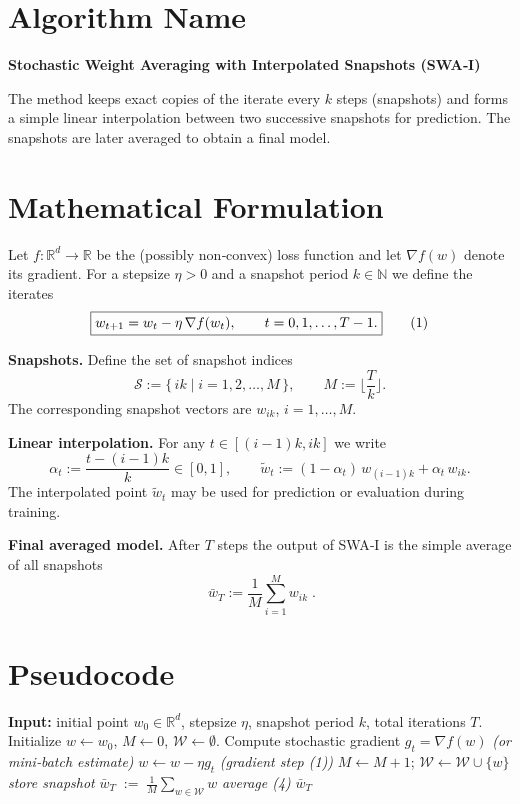 \documentclass{article}
\begin{document}
\section*{Algorithm Name}
\textbf{Stochastic Weight Averaging with Interpolated Snapshots (SWA‑I)}  

The method keeps exact copies of the iterate every $k$ steps (snapshots) and
forms a simple linear interpolation between two successive snapshots for
prediction.  The snapshots are later averaged to obtain a final
model.

\section*{Mathematical Formulation}
Let $f:\mathbb{R}^{d}\rightarrow\mathbb{R}$ be the (possibly non‑convex) loss
function and let $\nabla f(w)$ denote its gradient.  
For a stepsize $\eta>0$ and a snapshot period $k\in\mathbb{N}$ we define
the iterates
\[
\boxed{%
w_{t+1}=w_{t}-\eta\,\nabla f(w_{t}),\qquad t=0,1,\dots,T-1.}
\tag{1}
\]

\noindent
\textbf{Snapshots.}
Define the set of snapshot indices
\[
\mathcal{S}:=\{\,i k\mid i=1,2,\dots,M\,\},\qquad M:=\Big\lfloor\frac{T}{k}\Big\rfloor .
\tag{2}
\]
The corresponding snapshot vectors are $w_{i k}$, $i=1,\dots,M$.

\noindent
\textbf{Linear interpolation.}
For any $t\in[(i-1)k,i k]$ we write
\[
\alpha_{t}:=\frac{t-(i-1)k}{k}\in[0,1],\qquad
\tilde w_{t}:=(1-\alpha_{t})\,w_{(i-1)k}+\alpha_{t}\,w_{i k}.
\tag{3}
\]
The interpolated point $\tilde w_{t}$ may be used for prediction or
evaluation during training.

\noindent
\textbf{Final averaged model.}
After $T$ steps the output of SWA‑I is the simple average of all snapshots
\[
\boxed{\;\bar w_{T}:=\frac{1}{M}\sum_{i=1}^{M} w_{i k}\; }.
\tag{4}
\]

\section*{Pseudocode}
\begin{algorithm}[H]
\caption{SWA‑I}
\begin{algorithmic}[1]
\STATE \textbf{Input:} initial point $w_{0}\in\mathbb{R}^{d}$, stepsize $\eta$, snapshot period $k$, total iterations $T$.
\STATE Initialize $w\leftarrow w_{0}$, $M\leftarrow 0$, $\mathcal{W}\leftarrow\emptyset$.
    \STATE Compute stochastic gradient $g_{t}=\nabla f(w)$   \hfill \textit{(or mini‑batch estimate)}
    \STATE $w\leftarrow w-\eta g_{t}$ \hfill \textit{(gradient step (1))}
        \STATE $M\leftarrow M+1$;   $\mathcal{W}\leftarrow\mathcal{W}\cup\{w\}$   \hfill \textit{store snapshot}
    \ENDIF
\ENDFOR
\STATE $\displaystyle \bar w_{T}\;:=\;\frac{1}{M}\sum_{w\in\mathcal{W}} w$ \hfill \textit{average (4)}
\RETURN $\bar w_{T}$
\end{algorithmic}
\end{algorithm}
\end{document}

